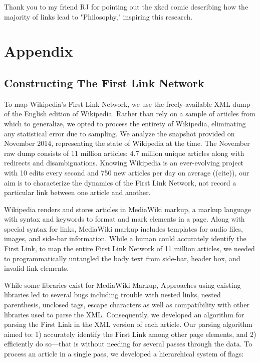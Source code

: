 \documentclass[pre,twocolumn,twoside,superscriptaddress,floatfix, aps, 10pt]{revtex4-1}
\begin{document}
\acknowledgments
Thank you to my friend RJ for pointing out the xkcd comic describing how the majority of links lead to "Philosophy," inspiring this research.


\newpage

\section*{Appendix}

\subsection*{Constructing The First Link Network}

To map Wikipedia's First Link Network, we use the freely-available XML dump of the English edition of Wikipedia. 
Rather than rely on a sample of articles from which to generalize, we opted to process the entirety of Wikipedia, 
eliminating any statistical error due to sampling.
We analyze the snapshot provided on November 2014, representing the state of Wikipedia at the time.
The November raw dump consists of 11 million articles: 4.7 million unique articles along with redirects
and disambiguations.
Knowing Wikipedia is an ever-evolving project with 10 edits every second and 750 new articles per day on average
((cite)), our aim is to characterize the dynamics of the First Link Network, not record a particular link between one
article and another.

Wikipedia renders and stores articles in MediaWiki markup, a markup language with syntax and keywords to format and mark elements in a page. Along with special syntax for links, MediaWiki markup includes templates for audio files, images, and side-bar
information.
While a human could accurately identify the First Link, to map the entire First Link Network of 11 million articles, we needed to programmatically untangled the body text from side-bar, header box, and invalid link elements.

While some libraries exist for MediaWiki Markup,
Approaches using existing libraries led to several bugs 
including trouble with nested links, nested parenthesis, unclosed tags, escape characters 
as well as compatibility with other libraries used to parse the XML.
Consequently,  we developed an algorithm for parsing the First Link in the XML version of each article.
Our parsing algorithm aimed to: 
1) accurately identify the First Link among other page elements, and 
2) efficiently do so---that is without needing for several passes through the data.
To process an article in a single pass, we developed a hierarchical system of flags:
\end{document}
